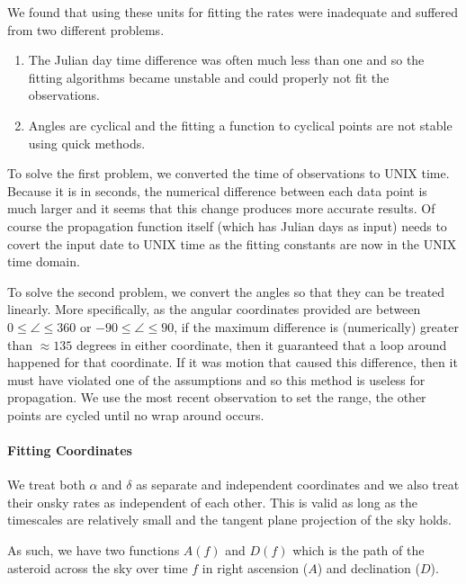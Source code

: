 \documentclass[letterpaper,11pt,english]{sphinxmanual}
\begin{document}
\sphinxAtStartPar
We found that using these units for fitting the rates were inadequate and
suffered from two different problems.
\begin{enumerate}
%
\item {} 
\sphinxAtStartPar
The Julian day time difference was often much less than one and so the fitting algorithms became unstable and could properly not fit the observations.

\item {} 
\sphinxAtStartPar
Angles are cyclical and the fitting a function to cyclical points are not stable using quick methods.

\end{enumerate}

\sphinxAtStartPar
To solve the first problem, we converted the time of observations to UNIX time.
Because it is in seconds, the numerical difference between each data point is
much larger and it seems that this change produces more accurate results. Of
course the propagation function itself (which has Julian days as input) needs
to covert the input date to UNIX time as the fitting constants are now in
the UNIX time domain.

\sphinxAtStartPar
To solve the second problem, we convert the angles so that they can be treated
linearly. More specifically, as the angular coordinates provided are between
\(0 \leq \angle \leq 360\) or \(-90 \leq \angle \leq 90\), if the
maximum difference is (numerically) greater than \(\approx 135\) degrees
in either coordinate, then it guaranteed that a loop around happened for that
coordinate. If it was motion that caused this difference, then it must have
violated one of the assumptions and so this method is useless for propagation.
We use the most recent observation to set the range, the other points are
cycled until no wrap around occurs.


\paragraph{Fitting Coordinates}
\label{\detokenize{technical/algorithms/polynomial_propagation:fitting-coordinates}}
\sphinxAtStartPar
We treat both \(\alpha\) and \(\delta\) as separate and independent
coordinates and we also treat their on\sphinxhyphen{}sky rates as independent of each other.
This is valid as long as the timescales are relatively small and the
tangent plane projection of the sky holds.

\sphinxAtStartPar
As such, we have two functions \(A(f)\) and \(D(f)\) which is the
path of the asteroid across the sky over time \(f\) in right ascension
(\(A\)) and declination (\(D\)).
\end{document}
